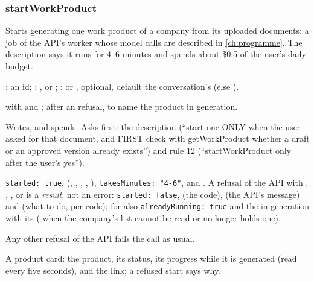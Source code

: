 \subsubsection{startWorkProduct}\label{sec:tools:startWorkProduct}
\begin{description}[style=multiline, leftmargin=19mm, labelwidth=17mm, labelsep=2mm,
  font=\sffamily\bfseries\footnotesize\color{ink}, itemsep=1pt, topsep=2pt, before=\raggedright]
  \item[Does] Starts generating one work product of a company from its uploaded documents: a
    job of the API's worker whose model calls are described in \cref{ch:programme}.
    The description says it runs for 4--6 minutes and spends about \$0.5 of the user's daily
    budget.
  \item[Input] : an id; : ,  or
    ; :  or , optional, default the
    conversation's (else ).
  \item[Calls]  with  and
    ; after an  refusal,
     to name the product in generation.
  \item[Kind] Writes, and spends. Asks first: the description (\enquote{start one ONLY when the
    user asked for that document, and FIRST check with getWorkProduct whether a draft or an
    approved version already exists}) and rule 12 (\enquote{startWorkProduct only after the
    user's yes}).
  \item[Returns] \texttt{started: true},  (, , ,
    , ), \texttt{takesMinutes: "4-6"},  and .
    A refusal of the API with , ,
    ,  or  is a \emph{result}, not
    an error: \texttt{started: false},  (the code),  (the API's
    message) and  (what to do, per code); for  also
    \texttt{alreadyRunning: true} and the  in generation with its 
    ( when the company's list cannot be read or no longer holds one).
  \item[Errors] Any other refusal of the API fails the call as usual.
  \item[Console] A product card: the product, its status, its progress while it is generated
    (read every five seconds), and the link; a refused start says why.
\end{description}

